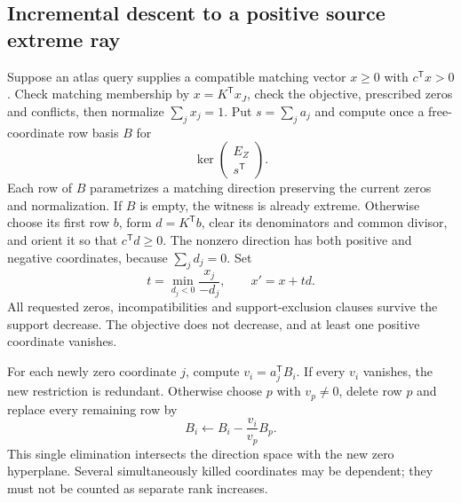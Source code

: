 \subsection{Incremental descent to a positive source extreme ray}

Suppose an atlas query supplies a compatible matching vector $x\geq0$ with
$c^{\mathsf T}x>0$.  Check matching membership by
$x=K^{\mathsf T}x_J$, check the objective, prescribed zeros and conflicts,
then normalize $\sum_jx_j=1$.  Put $s=\sum_ja_j$ and compute once a
free-coordinate row basis $B$ for
\[
 \ker\begin{pmatrix}E_Z\\s^{\mathsf T}\end{pmatrix}.
\]
Each row of $B$ parametrizes a matching direction preserving the current
zeros and normalization.  If $B$ is empty, the witness is already extreme.
Otherwise choose its first row $b$, form $d=K^{\mathsf T}b$, clear its
denominators and common divisor, and orient it so that $c^{\mathsf T}d\geq0$.
The nonzero direction has both positive and negative coordinates, because
$\sum_jd_j=0$.  Set
\[
 t=\min_{d_j<0}\frac{x_j}{-d_j},\qquad x'=x+td.
\]
All requested zeros, incompatibilities and support-exclusion clauses survive
the support decrease.  The objective does not decrease, and at least one
positive coordinate vanishes.

For each newly zero coordinate $j$, compute $v_i=a_j^{\mathsf T}B_i$.
If every $v_i$ vanishes, the new restriction is redundant.  Otherwise choose
$p$ with $v_p\ne0$, delete row $p$ and replace every remaining row by
\[
 B_i\longleftarrow B_i-\frac{v_i}{v_p}B_p.
\]
This single elimination intersects the direction space with the new zero
hyperplane.  Several simultaneously killed coordinates may be dependent;
they must not be counted as separate rank increases.

